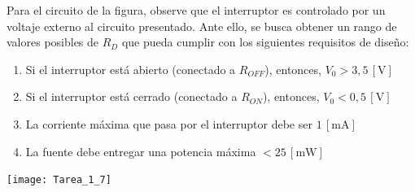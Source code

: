 \documentclass[
  11pt,
  letterpaper,
   addpoints,
  ]{exam}
\begin{document}
\begin{questions}
\newpage
\question Para el circuito de la figura, observe que el interruptor es controlado por un voltaje externo al circuito presentado. Ante ello, se busca obtener un rango de valores posibles de $R_D$ que pueda cumplir con los siguientes requisitos de diseño:

\begin{enumerate}
    \item Si el interruptor está abierto (conectado a $R_{OFF}$), entonces, $V_0 > 3{,}5\,\mathrm{[V]}$
    \item Si el interruptor está cerrado (conectado a $R_{ON}$), entonces, $V_0 < 0{,}5\,\mathrm{[V]}$
    \item La corriente máxima que pasa por el interruptor debe ser $1\,\mathrm{[mA]}$
    \item La fuente debe entregar una potencia máxima $< 25\,\mathrm{[mW]}$
\end{enumerate}
\begin{center}
    \texttt{[image: Tarea\_1\_7]}
\end{center}
\end{questions}
\end{document}
